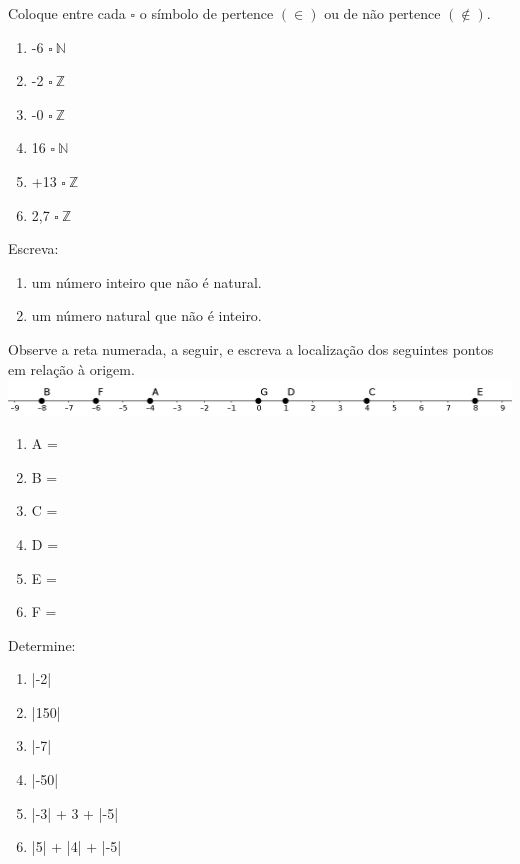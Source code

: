 		\item Coloque entre cada $\square$ o símbolo de pertence $(\in)$ ou de não pertence $(\notin)$.
		\begin{multicols}{3}
		\begin{enumerate}
			\item -6 $\square\ \mathbb{N}$ 
			\item -2 $\square\ \mathbb{Z}$ 
			\item -0 $\square\ \mathbb{Z}$
			\item 16 $\square\ \mathbb{N}$
			\item +13 $\square\ \mathbb{Z}$   
			\item 2,7 $\square\ \mathbb{Z}$ 
		\end{enumerate}		
		\end{multicols}
		
		\item Escreva:
		\begin{multicols}{2}
		\begin{enumerate}
			\item um número inteiro que não é natural.
			\item um número natural que não é inteiro.
		\end{enumerate}
		\end{multicols}
		
		\item Observe a reta numerada, a seguir, e escreva a localização dos seguintes pontos em relação à origem.
		\newline
		\includegraphics[scale=0.3]{figuras/fig44.png} 		
		\begin{multicols}{3}
		\begin{enumerate}
			\item A = 
			\item B = 
			\item C =
			\item D =
			\item E =
			\item F = 
		\end{enumerate}
		\end{multicols}
		
		\item Determine:
		\begin{multicols}{3}
		\begin{enumerate}
			\item |-2| 
			\item |150|
			\item |-7|
			\item |-50|
			\item |-3| + 3 + |-5|
			\item |5| + |4| + |-5|
		\end{enumerate}
		\end{multicols}
		
